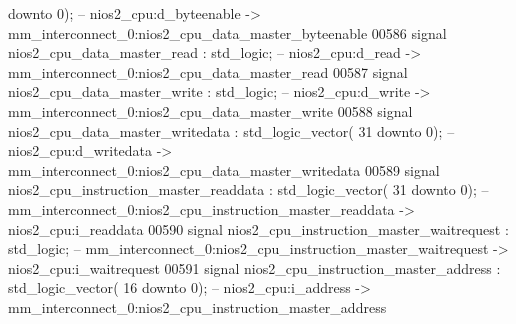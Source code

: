 \begin{DoxyCode}
       \textcolor{keywordflow}{downto} \textcolor{vhdllogic}{}\textcolor{vhdllogic}{0}\textcolor{vhdlchar}{)};\textcolor{keyword}{  -- nios2\_cpu:d\_byteenable -> mm\_interconnect\_0:nios2\_cpu\_data\_master\_byteenable}
00586     \textcolor{keywordflow}{signal} \textcolor{vhdlchar}{nios2_cpu_data_master_read}                                                  \textcolor{vhdlchar}{:} \textcolor{comment}{std\_logic};\textcolor{keyword}{        
                   -- nios2\_cpu:d\_read -> mm\_interconnect\_0:nios2\_cpu\_data\_master\_read}
00587     \textcolor{keywordflow}{signal} \textcolor{vhdlchar}{nios2_cpu_data_master_write}                                                 \textcolor{vhdlchar}{:} \textcolor{comment}{std\_logic};\textcolor{keyword}{        
                   -- nios2\_cpu:d\_write -> mm\_interconnect\_0:nios2\_cpu\_data\_master\_write}
00588     \textcolor{keywordflow}{signal} \textcolor{vhdlchar}{nios2_cpu_data_master_writedata}                                             \textcolor{vhdlchar}{:} \textcolor{comment}{std\_logic\_vector}\textcolor{vhdlchar}{(}\textcolor{vhdllogic}{}\textcolor{vhdllogic}{
      31} \textcolor{keywordflow}{downto} \textcolor{vhdllogic}{}\textcolor{vhdllogic}{0}\textcolor{vhdlchar}{)};\textcolor{keyword}{ -- nios2\_cpu:d\_writedata -> mm\_interconnect\_0:nios2\_cpu\_data\_master\_writedata}
00589     \textcolor{keywordflow}{signal} \textcolor{vhdlchar}{nios2_cpu_instruction_master_readdata}                                       \textcolor{vhdlchar}{:} \textcolor{comment}{std\_logic\_vector}\textcolor{vhdlchar}{(}\textcolor{vhdllogic}{}\textcolor{vhdllogic}{
      31} \textcolor{keywordflow}{downto} \textcolor{vhdllogic}{}\textcolor{vhdllogic}{0}\textcolor{vhdlchar}{)};\textcolor{keyword}{ -- mm\_interconnect\_0:nios2\_cpu\_instruction\_master\_readdata -> nios2\_cpu:i\_readdata}
00590     \textcolor{keywordflow}{signal} \textcolor{vhdlchar}{nios2_cpu_instruction_master_waitrequest}                                    \textcolor{vhdlchar}{:} \textcolor{comment}{std\_logic};\textcolor{keyword}{        
                   -- mm\_interconnect\_0:nios2\_cpu\_instruction\_master\_waitrequest -> nios2\_cpu:i\_waitrequest}
00591     \textcolor{keywordflow}{signal} \textcolor{vhdlchar}{nios2_cpu_instruction_master_address}                                        \textcolor{vhdlchar}{:} \textcolor{comment}{std\_logic\_vector}\textcolor{vhdlchar}{(}\textcolor{vhdllogic}{}\textcolor{vhdllogic}{
      16} \textcolor{keywordflow}{downto} \textcolor{vhdllogic}{}\textcolor{vhdllogic}{0}\textcolor{vhdlchar}{)};\textcolor{keyword}{ -- nios2\_cpu:i\_address -> mm\_interconnect\_0:nios2\_cpu\_instruction\_master\_address}

\end{DoxyCode}
